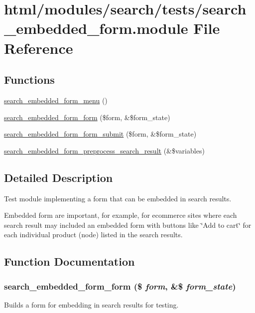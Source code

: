 \hypertarget{search__embedded__form_8module}{
\section{html/modules/search/tests/search\_\-embedded\_\-form.module File Reference}
\label{search__embedded__form_8module}
}
\subsection*{Functions}
\begin{DoxyCompactItemize}
\item 
\hyperlink{search__embedded__form_8module_ae274584aa14bbc0cb6f3364537945562}{search\_\-embedded\_\-form\_\-menu} ()
\item 
\hyperlink{search__embedded__form_8module_a5159e0d5e6569031ea180af578e844ff}{search\_\-embedded\_\-form\_\-form} (\$form, \&\$form\_\-state)
\item 
\hyperlink{search__embedded__form_8module_a4ac1f14b46e498aa189d6fa37ef07bb6}{search\_\-embedded\_\-form\_\-form\_\-submit} (\$form, \&\$form\_\-state)
\item 
\hyperlink{search__embedded__form_8module_a45bd8ca2767b0b47d790515c38383713}{search\_\-embedded\_\-form\_\-preprocess\_\-search\_\-result} (\&\$variables)
\end{DoxyCompactItemize}


\subsection{Detailed Description}
Test module implementing a form that can be embedded in search results.

Embedded form are important, for example, for ecommerce sites where each search result may included an embedded form with buttons like \char`\"{}Add to cart\char`\"{} for each individual product (node) listed in the search results. 

\subsection{Function Documentation}
\hypertarget{search__embedded__form_8module_a5159e0d5e6569031ea180af578e844ff}{
\subsubsection[{search\_\-embedded\_\-form\_\-form}]{\setlength{\rightskip}{0pt plus 5cm}search\_\-embedded\_\-form\_\-form (\$ {\em form}, \/  \&\$ {\em form\_\-state})}}
\label{search__embedded__form_8module_a5159e0d5e6569031ea180af578e844ff}
Builds a form for embedding in search results for testing.

